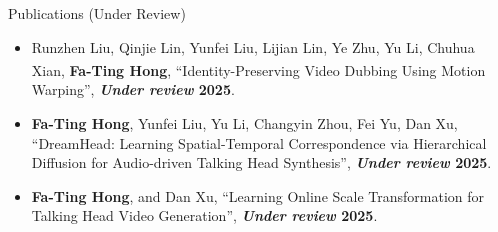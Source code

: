 \documentclass{resume} %
\begin{document}
\begin{rSection}{Publications (Under Review)}
    \begin{itemize}[leftmargin=10pt]
    \item Runzhen Liu, Qinjie Lin, Yunfei Liu, Lijian Lin, Ye Zhu, Yu Li, Chuhua Xian, \textbf{Fa-Ting Hong}{\textsuperscript{\Letter}}, ``Identity-Preserving Video Dubbing Using Motion Warping'', \textbf{\textit{Under review} 2025}.
    \vspace{-5pt}
    
    \item \textbf{Fa-Ting Hong}, Yunfei Liu, Yu Li, Changyin Zhou, Fei Yu, Dan Xu, ``DreamHead: Learning Spatial-Temporal Correspondence via Hierarchical Diffusion for Audio-driven Talking Head Synthesis'', \textbf{\textit{Under review} 2025}.
    \vspace{-5pt}

    \item \textbf{Fa-Ting Hong}, and Dan Xu, ``Learning Online Scale Transformation for Talking Head Video Generation'', \textbf{\textit{Under review} 2025}.
    \vspace{-5pt}
    \end{itemize}
\end{rSection}
\end{document}
